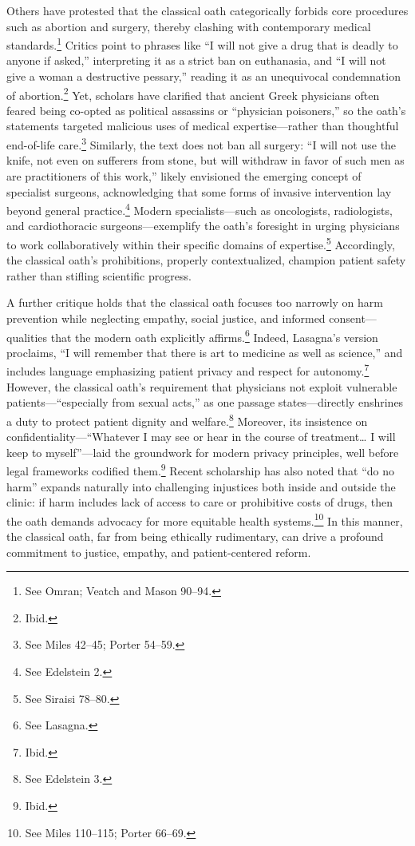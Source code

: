 \documentclass[12pt]{article}
\begin{document}
\bigskip

Others have protested that the classical oath categorically forbids core procedures such as abortion and surgery, thereby clashing with contemporary medical standards.\footnote{See Omran; Veatch and Mason 90--94.} Critics point to phrases like “I will not give a drug that is deadly to anyone if asked,” interpreting it as a strict ban on euthanasia, and “I will not give a woman a destructive pessary,” reading it as an unequivocal condemnation of abortion.\footnote{Ibid.} Yet, scholars have clarified that ancient Greek physicians often feared being co-opted as political assassins or “physician poisoners,” so the oath’s statements targeted malicious uses of medical expertise—rather than thoughtful end-of-life care.\footnote{See Miles 42--45; Porter 54--59.} Similarly, the text does not ban all surgery: “I will not use the knife, not even on sufferers from stone, but will withdraw in favor of such men as are practitioners of this work,” likely envisioned the emerging concept of specialist surgeons, acknowledging that some forms of invasive intervention lay beyond general practice.\footnote{See Edelstein 2.} Modern specialists—such as oncologists, radiologists, and cardiothoracic surgeons—exemplify the oath’s foresight in urging physicians to work collaboratively within their specific domains of expertise.\footnote{See Siraisi 78--80.} Accordingly, the classical oath’s prohibitions, properly contextualized, champion patient safety rather than stifling scientific progress.

\bigskip

A further critique holds that the classical oath focuses too narrowly on harm prevention while neglecting empathy, social justice, and informed consent—qualities that the modern oath explicitly affirms.\footnote{See Lasagna.} Indeed, Lasagna’s version proclaims, “I will remember that there is art to medicine as well as science,” and includes language emphasizing patient privacy and respect for autonomy.\footnote{Ibid.} However, the classical oath’s requirement that physicians not exploit vulnerable patients—“especially from sexual acts,” as one passage states—directly enshrines a duty to protect patient dignity and welfare.\footnote{See Edelstein 3.} Moreover, its insistence on confidentiality—“Whatever I may see or hear in the course of treatment… I will keep to myself”—laid the groundwork for modern privacy principles, well before legal frameworks codified them.\footnote{Ibid.} Recent scholarship has also noted that “do no harm” expands naturally into challenging injustices both inside and outside the clinic: if harm includes lack of access to care or prohibitive costs of drugs, then the oath demands advocacy for more equitable health systems.\footnote{See Miles 110--115; Porter 66--69.} In this manner, the classical oath, far from being ethically rudimentary, can drive a profound commitment to justice, empathy, and patient-centered reform.
\end{document}
